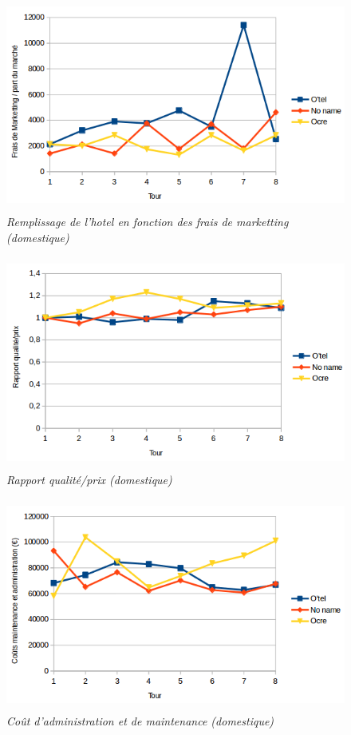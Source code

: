 \documentclass[a4paper,10pt]{article}
\begin{document}
    \begin{figure}[!ht]
      \begin{center}
	\includegraphics[height=7cm,keepaspectratio]{./images/marketting_part_marche.png}
      \end{center}
      \caption{\textit{Remplissage de l'hotel en fonction des frais de marketting (domestique)}}
    \end{figure}
    
    \begin{figure}[!ht]
      \begin{center}
	\includegraphics[height=7cm,keepaspectratio]{./images/rapport_qualite_prix.png}
      \end{center}
      \caption{\textit{Rapport qualité/prix (domestique)}}
    \end{figure}

    \begin{figure}[!ht]
      \begin{center}
	\includegraphics[height=7cm,keepaspectratio]{./images/cout_administration_et_maintenance.png}
      \end{center}
      \caption{\textit{Coût d'administration et de maintenance (domestique)}}
    \end{figure}
\end{document}
